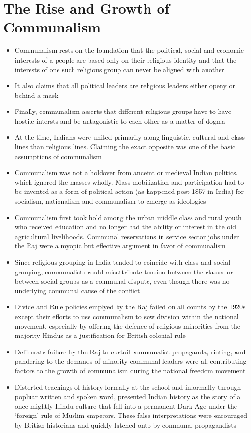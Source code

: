 \section{The Rise and Growth of Communalism}
\begin{itemize}
    \item Communalism rests on the foundation that the political, social and economic interests of a people are based only on their religious identity and that the interests of one such religious group can never be aligned with another
    \item It also claims that all political leaders are religious leaders either openy or behind a mask
    \item Finally, communalism asserts that different religious groups have to have hostile intersts and be antagonistic to each other as a matter of dogma
    \item At the time, Indians were united primarily along linguistic, cultural and class lines than religious lines. Claiming the exact opposite was one of the basic assumptions of communalism
    \item Communalism was not a holdover from anceint or medieval Indian politics, which ignored the masses wholly. Mass mobilization and participation had to be invented as a form of political action (as happened post 1857 in India) for socialism, nationalism and communalism to emerge as ideologies
    \item Communalism first took hold among the urban middle class and rural youth who received education and no longer had the ability or interest in the old agricultural livelihoods. Communal reservations in service sector jobs under the Raj were a myopic but effective argument in favor of communalism
    \item Since religious grouping in India tended to coincide with class and social grouping, communalists could misattribute tension between the classes or between social groups as a communal dispute, even though there was no underlying communal cause of the conflict
    \item Divide and Rule policies emplyed by the Raj failed on all counts by the 1920s except their efforts to use communalism to sow division within the national movement, especially by offering the defence of religious minorities from the majority Hindus as a justification for British colonial rule
    \item Deliberate failure by the Raj to curtail communalist propaganda, rioting, and pandering to the demands of minority communal leaders were all contributing factors to the growth of communalism during the national freedom movement
    \item Distorted teachings of history formally at the school and informally through popluar written and spoken word, presented Indian history as the story of a once mightly Hindu culture that fell into a permanent Dark Age under the `foreign' rule of Muslim emperors. These false interpretations were encouraged by British historians and quickly latched onto by communal propagandists
\end{itemize}


